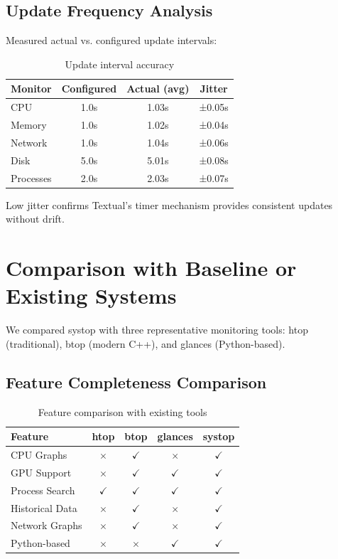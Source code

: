 \documentclass[12pt,a4paper,oneside]{report}
\begin{document}
\subsection{Update Frequency Analysis}

Measured actual vs. configured update intervals:

\begin{table}[h]
\centering
\caption{Update interval accuracy}
\label{tab:intervals}
\small
\begin{tabular}{|l|c|c|c|}
\hline
\textbf{Monitor} & \textbf{Configured} & \textbf{Actual (avg)} & \textbf{Jitter} \\
\hline
CPU & 1.0s & 1.03s & ±0.05s \\
Memory & 1.0s & 1.02s & ±0.04s \\
Network & 1.0s & 1.04s & ±0.06s \\
Disk & 5.0s & 5.01s & ±0.08s \\
Processes & 2.0s & 2.03s & ±0.07s \\
\hline
\end{tabular}
\end{table}

Low jitter confirms Textual's timer mechanism provides consistent updates without drift.

\section{Comparison with Baseline or Existing Systems}
\label{sec:comparison}

We compared systop with three representative monitoring tools: htop (traditional), btop (modern C++), and glances (Python-based).

\subsection{Feature Completeness Comparison}

\begin{table}[h]
\centering
\caption{Feature comparison with existing tools}
\label{tab:feature-compare}
\small
\begin{tabular}{|l|c|c|c|c|}
\hline
\textbf{Feature} & \textbf{htop} & \textbf{btop} & \textbf{glances} & \textbf{systop} \\
\hline
CPU Graphs & $\times$ & $\checkmark$ & $\times$ & $\checkmark$ \\
GPU Support & $\times$ & $\checkmark$ & $\checkmark$ & $\checkmark$ \\
Process Search & $\checkmark$ & $\checkmark$ & $\checkmark$ & $\checkmark$ \\
Historical Data & $\times$ & $\checkmark$ & $\times$ & $\checkmark$ \\
Network Graphs & $\times$ & $\checkmark$ & $\times$ & $\checkmark$ \\
Python-based & $\times$ & $\times$ & $\checkmark$ & $\checkmark$ \\
\hline
\end{tabular}
\end{table}
\end{document}
